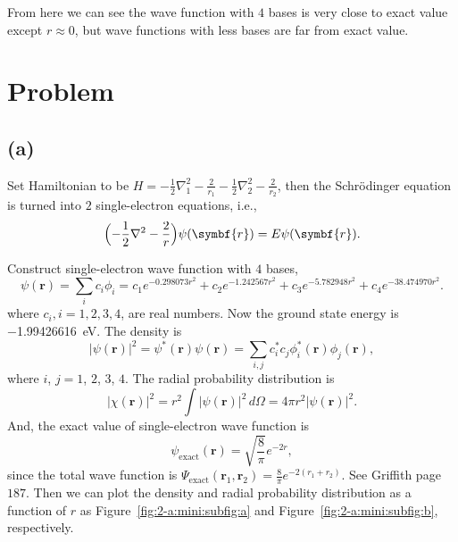 From here we can see the wave function with $4$ bases is very close to exact value except $r \approx 0$, but
wave functions with less bases are far from exact value.


\section{Problem }

\subsection*{(a)}

Set Hamiltonian to be $H = -\frac{1}{2}\nabla_1^2 - \frac{2}{r_1} - \frac{1}{2}\nabla_2^2 - \frac{2}{r_2}$, then
the Schrödinger equation is turned into $2$ single-electron equations, i.e.,
%
\begin{equation}
    \Bigl(-\frac{1}{2}\nabla^2 - \frac{2}{r}\Bigr) \psi(\symbf{r}) = E \psi(\symbf{r}).
\end{equation}

Construct single-electron wave function with $4$ bases,
%
\begin{equation}
    \psi(\symbf{r}) = \sum_{i} c_i \phi_i = c_1 e^{- 0.298073 r^2} +
    c_2 e^{- 1.242567 r^2} + c_3 e^{- 5.782948 r^2} + c_4 e^{-38.474970 r^2}.
\end{equation}
%
where $c_i, i=1,2,3,4$, are real numbers.
Now the ground state energy is \qty{-1.99426616}{\electronvolt}. The density is
%
\begin{equation}\label{eq:density}
    \lvert \psi(\symbf{r}) \rvert^2 = \psi^\ast(\symbf{r}) \psi(\symbf{r}) =
    \sum_{i, j} c_i^\ast c_j \phi_i^\ast(\symbf{r}) \phi_j(\symbf{r}),
\end{equation}
%
where $i$, $j = 1$, $2$, $3$, $4$. The radial probability distribution is
%
\begin{equation}
    \lvert \chi(\symbf{r}) \rvert^2 = r^2\int \lvert \psi(\symbf{r}) \rvert^2
    \, d\Omega = 4\pi r^2 \lvert \psi(\symbf{r}) \rvert^2.
\end{equation}
%
And, the exact value of single-electron wave function is
%
\begin{equation}
    \psi_{\text{exact}}(\symbf{r}) = \sqrt{\frac{8}{\pi}} e^{-2 r}, %
\end{equation}
%
since the total wave function is $\Psi_{\text{exact}}(\symbf{r}_1, \symbf{r}_2) = \frac{8}{\pi} e^{-2(r_1 + r_2)}$.
See Griffith page $187$\footnotemark.
Then we can plot the density and radial probability distribution as a function of $r$
as Figure~\ref{fig:2-a:mini:subfig:a} and Figure~\ref{fig:2-a:mini:subfig:b}, respectively.

